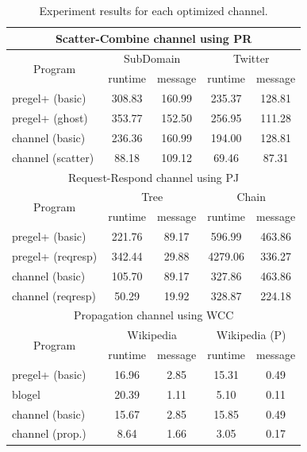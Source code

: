 \documentclass{sokendai_thesis} %
\begin{document}
\begin{table}[t]
\centering
\caption{Experiment results for each optimized channel.}
\label{tab:results}
\begin{tabular}{l|c|c|c|c}
\hline
\multicolumn{5}{c}{Scatter-Combine channel using PR} \\
\hline
\multicolumn{1}{c}{\multirow{2}{*}{Program}} & \multicolumn{2}{|c}{SubDomain} & \multicolumn{2}{|c}{Twitter} \\
\cline{2-5}
& \small runtime & \small message & \small runtime & \small message \\
\hline
pregel+ (basic) & 308.83 & 160.99 & 235.37 & 128.81 \\
\hline
pregel+ (ghost) & 353.77 & 152.50 & 256.95 & 111.28 \\
\hline
channel (basic) & 236.36 & 160.99 & 194.00 & 128.81 \\
\hline
channel (scatter) & 88.18 & 109.12 & 69.46 & 87.31 \\
\hline
\hline
\multicolumn{5}{c}{Request-Respond channel using PJ} \\
\hline
\multicolumn{1}{c}{\multirow{2}{*}{Program}} & \multicolumn{2}{|c}{Tree} & \multicolumn{2}{|c}{Chain} \\
\cline{2-5}
& \small runtime & \small message & \small runtime & \small message \\
\hline
pregel+ (basic) & 221.76 & 89.17  & 596.99 & 463.86  \\
\hline
pregel+ (reqresp) & 342.44 & 29.88  & 4279.06 & 336.27  \\
\hline
channel (basic) & 105.70 & 89.17  & 327.86 & 463.86  \\
\hline
channel (reqresp) & 50.29 & 19.92  & 328.87 & 224.18  \\
\hline
\hline
\multicolumn{5}{c}{Propagation channel using WCC} \\
\hline
\multicolumn{1}{c}{\multirow{2}{*}{Program}} & \multicolumn{2}{|c}{Wikipedia} & \multicolumn{2}{|c}{Wikipedia (P)} \\
\cline{2-5}
& \small runtime & \small message & \small runtime & \small message \\
\hline
pregel+ (basic) & 16.96 & 2.85  & 15.31 & 0.49  \\
\hline
blogel & 20.39 & 1.11  & 5.10 & 0.11  \\
\hline
channel (basic) & 15.67 & 2.85  & 15.85 & 0.49  \\
\hline
channel (prop.) & 8.64 & 1.66  & 3.05 & 0.17  \\
\hline
\end{tabular}
\end{table}
\end{document}

